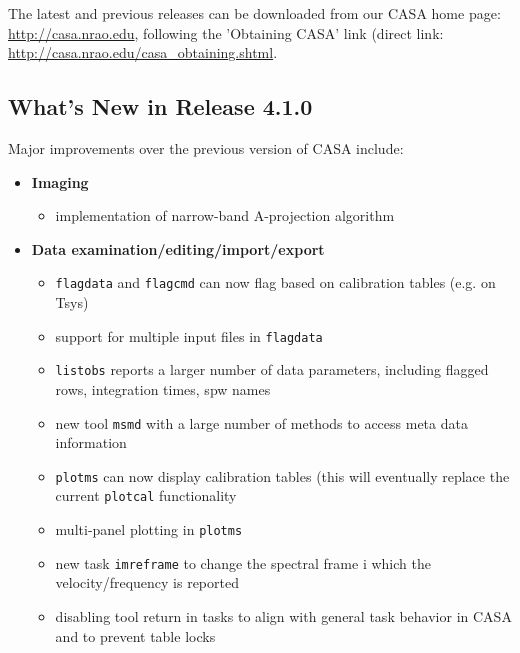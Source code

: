 The latest and previous releases can be downloaded from our CASA home
page: \url{http://casa.nrao.edu}, following the 'Obtaining CASA'
link (direct link: \url{http://casa.nrao.edu/casa_obtaining.shtml}.






\subsection{What's New in Release 4.1.0}
\label{section:intro.release.whatsnew}


Major improvements over the previous version of CASA include:
\begin{itemize}

\item  {\bf Imaging}
  \begin{itemize}
    \item  implementation of narrow-band A-projection algorithm

\end{itemize}


\item  {\bf Data examination/editing/import/export}
   \begin{itemize}
        \item  {\tt flagdata} and {\tt flagcmd} can now flag based on
  calibration tables (e.g. on Tsys)
    \item  support for multiple input files in {\tt flagdata}
     \item  {\tt listobs} reports a larger number of data parameters,
   including flagged rows, integration times, spw names
     \item  new tool {\tt msmd} with a large number of methods to access meta data information
     \item  {\tt plotms} can now display calibration tables (this will eventually replace the current {\tt plotcal} functionality
     \item  multi-panel plotting in {\tt plotms}
     \item  new task {\tt imreframe} to change the spectral frame i which the velocity/frequency is reported
     \item  disabling tool return in tasks to align with
   general task behavior in CASA and to prevent table locks
    
\end{itemize}


\end{itemize}
